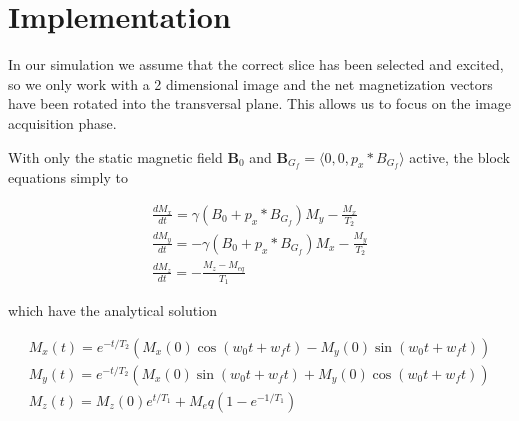 \section{Implementation}



In our simulation we assume that the correct slice has been selected
and excited, so we only work with a 2 dimensional image and the net
magnetization vectors have been rotated into the transversal
plane. This allows us to focus on the image acquisition phase.


With only the static magnetic field $\mathbf{B}_0$ and
$\mathbf{B}_{G_f} = \langle 0, 0, p_x * B_{G_f} \rangle$ active, the
block equations simply to

\begin{displaymath}
  \begin{array}{l}
    \frac{dM_x}{dt} = \gamma (B_0 + p_x * B_{G_f}) M_y - \frac{M_x}{T_2} \\
    \frac{dM_y}{dt} = - \gamma (B_0 + p_x * B_{G_f}) M_x - \frac{M_y}{T_2} \\
    \frac{dM_z}{dt} = - \frac{M_z - M_{eq}}{T_1}
  \end{array}
\end{displaymath}

which have the analytical solution 

\begin{displaymath}
  \begin{array}{l}
    M_x(t) = e^{-t/T_2}(M_x(0) \cos(w_0 t + w_f t) - M_y(0) \sin (w_0 t + w_f t)) \\
    M_y(t) = e^{-t/T_2}(M_x(0) \sin(w_0 t + w_f t) + M_y(0) \cos (w_0 t + w_f t)) \\
    M_z(t) = M_z(0) e^{t/T_1} + M_eq(1 - e^{-1/T_1})
  \end{array}
\end{displaymath}





